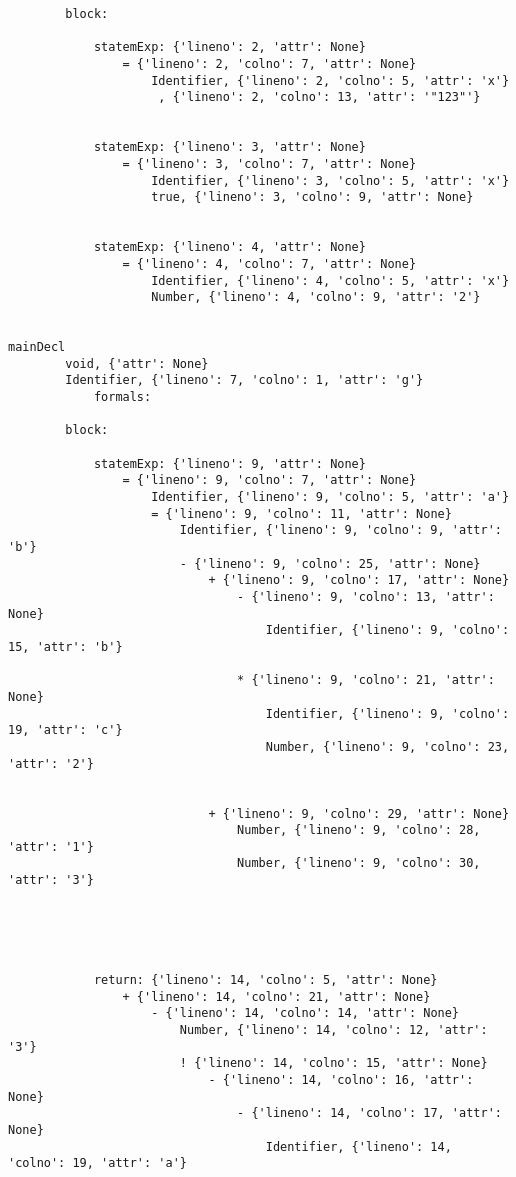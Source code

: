 \documentclass{article}
\begin{document}
\begin{itemize}
\begin{verbatim}
        block:

            statemExp: {'lineno': 2, 'attr': None}
                = {'lineno': 2, 'colno': 7, 'attr': None}
                    Identifier, {'lineno': 2, 'colno': 5, 'attr': 'x'}
                     , {'lineno': 2, 'colno': 13, 'attr': '"123"'}


            statemExp: {'lineno': 3, 'attr': None}
                = {'lineno': 3, 'colno': 7, 'attr': None}
                    Identifier, {'lineno': 3, 'colno': 5, 'attr': 'x'}
                    true, {'lineno': 3, 'colno': 9, 'attr': None}


            statemExp: {'lineno': 4, 'attr': None}
                = {'lineno': 4, 'colno': 7, 'attr': None}
                    Identifier, {'lineno': 4, 'colno': 5, 'attr': 'x'}
                    Number, {'lineno': 4, 'colno': 9, 'attr': '2'}


mainDecl
        void, {'attr': None}
        Identifier, {'lineno': 7, 'colno': 1, 'attr': 'g'}
            formals:

        block:

            statemExp: {'lineno': 9, 'attr': None}
                = {'lineno': 9, 'colno': 7, 'attr': None}
                    Identifier, {'lineno': 9, 'colno': 5, 'attr': 'a'}
                    = {'lineno': 9, 'colno': 11, 'attr': None}
                        Identifier, {'lineno': 9, 'colno': 9, 'attr': 'b'}
                        - {'lineno': 9, 'colno': 25, 'attr': None}
                            + {'lineno': 9, 'colno': 17, 'attr': None}
                                - {'lineno': 9, 'colno': 13, 'attr': None}
                                    Identifier, {'lineno': 9, 'colno': 15, 'attr': 'b'}

                                * {'lineno': 9, 'colno': 21, 'attr': None}
                                    Identifier, {'lineno': 9, 'colno': 19, 'attr': 'c'}
                                    Number, {'lineno': 9, 'colno': 23, 'attr': '2'}


                            + {'lineno': 9, 'colno': 29, 'attr': None}
                                Number, {'lineno': 9, 'colno': 28, 'attr': '1'}
                                Number, {'lineno': 9, 'colno': 30, 'attr': '3'}





            return: {'lineno': 14, 'colno': 5, 'attr': None}
                + {'lineno': 14, 'colno': 21, 'attr': None}
                    - {'lineno': 14, 'colno': 14, 'attr': None}
                        Number, {'lineno': 14, 'colno': 12, 'attr': '3'}
                        ! {'lineno': 14, 'colno': 15, 'attr': None}
                            - {'lineno': 14, 'colno': 16, 'attr': None}
                                - {'lineno': 14, 'colno': 17, 'attr': None}
                                    Identifier, {'lineno': 14, 'colno': 19, 'attr': 'a'}





\end{verbatim}
\end{itemize}
\end{document}
